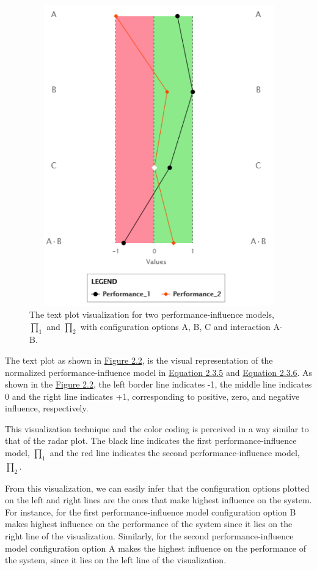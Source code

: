 \begin{figure}[ht]
\centering
\label{textPlot}
\includegraphics[width=12cm,height=13cm,keepaspectratio,]{pics/text_plot.pdf}
\caption[The Text Plot]{The text plot visualization for two performance-influence models, $\prod_1$ and $\prod_2$ with configuration options A, B, C and interaction A$\cdot$B.}
\end{figure}

The text plot as shown in \hyperref[textPlot]{Figure 2.2}, is the visual representation of the normalized performance-influence model in \hyperref[eq:2.3.5]{Equation 2.3.5} and \hyperref[eq:2.3.6]{Equation 2.3.6}. As shown in the \hyperref[textPlot]{Figure 2.2}, the left border line indicates -1, the middle line indicates 0 and the right line indicates +1, corresponding to positive, zero, and negative influence, respectively. 

This visualization technique and the color coding is perceived in a way similar to that of the radar plot. The black line indicates the first performance-influence model, $\prod_1$ and the red line indicates the second performance-influence model, $\prod_2$. 

From this visualization, we can easily infer that the configuration options plotted on the left and right lines are the ones that make highest influence on the system. For instance, for the first performance-influence model configuration option B makes highest influence on the performance of the system since it lies on the right line of the visualization. Similarly, for the second performance-influence model configuration option A makes the highest influence on the performance of the system, since it lies on the left line of the visualization.

